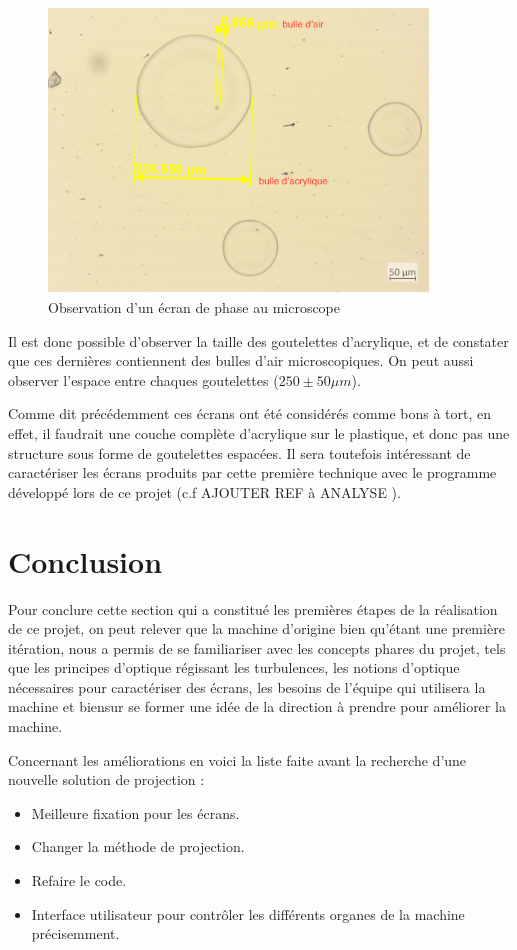\begin{figure}[H]
  \centering
  \includegraphics[width = 0.9\textwidth]{assets/figures/situation_initiale/observation_microscope.png}
  \caption{Observation d'un écran de phase au microscope}\label{fig:ecran_phase_beta_microscope}
\end{figure}
Il est donc possible d'observer la taille des goutelettes d'acrylique, et de constater que ces dernières contiennent des bulles d'air microscopiques.
On peut aussi observer l'espace entre chaques goutelettes ($250\pm 50 \mu m$).

Comme dit précédemment ces écrans ont été considérés comme bons à tort, en effet, il faudrait une couche complète d'acrylique sur le plastique, et donc pas une structure sous forme de goutelettes espacées.
Il sera toutefois intéressant de caractériser les écrans produits par cette première technique avec le programme développé lors de ce projet (c.f \color{red} AJOUTER REF à ANALYSE \color{black}).

\section{Conclusion}
Pour conclure cette section qui a constitué les premières étapes de la réalisation de ce projet, on peut relever que la machine d'origine bien qu'étant une première itération, nous a permis de se familiariser avec les concepts phares du projet, tels que
les principes d'optique régissant les turbulences, les notions d'optique nécessaires pour caractériser des écrans, les besoins de l'équipe qui utilisera la machine et biensur se former une idée de la direction à prendre pour améliorer la machine.

Concernant les améliorations en voici la liste faite avant la recherche d'une nouvelle solution de projection :
\begin{itemize}
  \item Meilleure fixation pour les écrans.
  \item Changer la méthode de projection.
  \item Refaire le code.
  \item Interface utilisateur pour contrôler les différents organes de la machine précisemment.
\end{itemize}